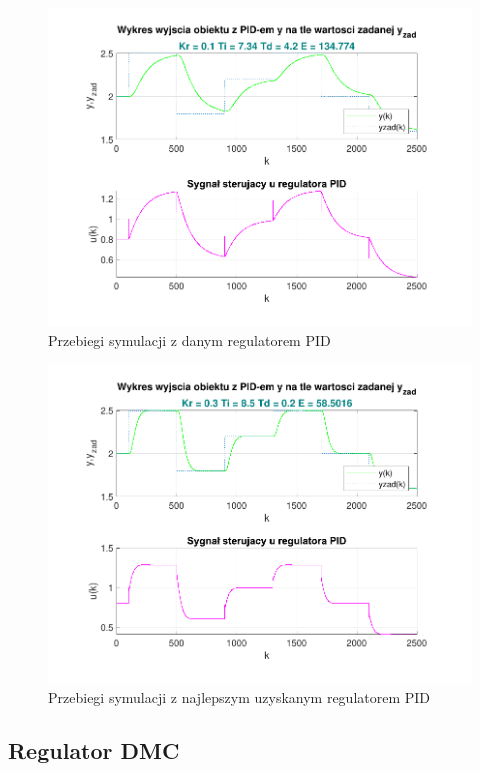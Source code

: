 \begin{figure}[H]
    \centering
    \includegraphics[scale=0.90]{../projekt/zad4_5/PID_pdf/PID_2.pdf}
    \caption{Przebiegi symulacji z danym regulatorem PID}
\end{figure}

\begin{figure}[H]
    \centering
    \includegraphics[scale=0.90]{../projekt/zad4_5/PID_pdf/PID_best.pdf}
    \caption{Przebiegi symulacji z najlepszym uzyskanym regulatorem PID}
\end{figure}

\subsection{Regulator DMC}

